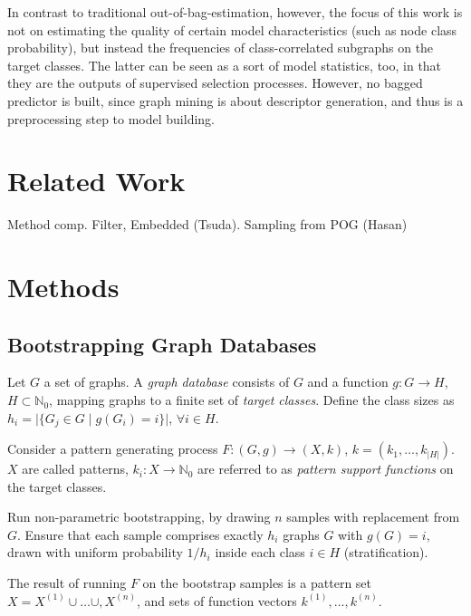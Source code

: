 \documentclass{article}
\begin{document}
In contrast to traditional out-of-bag-estimation, however, the focus of this work is not on estimating the quality of certain model characteristics (such as node class probability), but instead the frequencies of class-correlated subgraphs on the target classes. The latter can be seen as a sort of model statistics, too, in that they are the outputs of supervised selection processes. However, no bagged predictor is built, since graph mining is about descriptor generation, and thus is a preprocessing step to model building.

\section{Related Work}
Method comp. Filter, Embedded (Tsuda). Sampling from POG (Hasan)

\section{Methods}
\subsection{Bootstrapping Graph Databases}
Let $G$ a set of graphs. A \emph{graph database} consists of $G$ and a function $g: G \rightarrow H$, $H \subset \mathbb{N}_0$, mapping graphs to a finite set of \emph{target classes}. Define the class sizes as $h_i=\vert\{G_j \in G \; \vert\; g(G_i)=i\}\vert$, $\forall i \in H$.

Consider a pattern generating process $F: (G,g) \rightarrow (X,k)$, $k=\left(k_1,\ldots,k_{\vert H\vert}\right)$. $X$ are called patterns, $k_i: X \rightarrow \mathbb{N}_0$ are referred to as \emph{pattern support functions} on the target classes.

Run non-parametric bootstrapping, by drawing $n$ samples with replacement from $G$. Ensure that each sample comprises exactly $h_i$ graphs $G$ with $g(G)=i$, drawn with uniform probability $1/h_i$ inside each class $i \in H$ (stratification).

The result of running $F$ on the bootstrap samples is a pattern set $X= X^{(1)}\cup\ldots\cup,X^{(n)}$, and sets of function vectors $k^{(1)},\ldots,k^{(n)}$.
\end{document}
